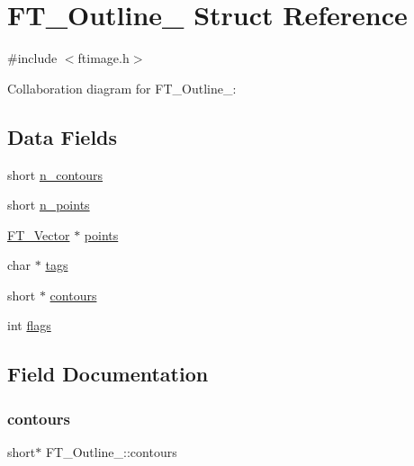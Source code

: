 \hypertarget{struct_f_t___outline__}{}\section{F\+T\+\_\+\+Outline\+\_\+ Struct Reference}
\label{struct_f_t___outline__}


{\ttfamily \#include $<$ftimage.\+h$>$}



Collaboration diagram for F\+T\+\_\+\+Outline\+\_\+\+:
\subsection*{Data Fields}
\begin{DoxyCompactItemize}
\item 
short \hyperlink{struct_f_t___outline___a0313ba9c2c51f10e6b7d7ef97bd946e2}{n\+\_\+contours}
\item 
short \hyperlink{struct_f_t___outline___a7ebcf3c33231af88655534d1ac02b66e}{n\+\_\+points}
\item 
\hyperlink{ftimage_8h_ab158b5a7e422acb1968af95db786d018}{F\+T\+\_\+\+Vector} $\ast$ \hyperlink{struct_f_t___outline___a4871896a2f38bdab947e30a7cf6bca04}{points}
\item 
char $\ast$ \hyperlink{struct_f_t___outline___ac84ca66907361e1f49ec11c14720087a}{tags}
\item 
short $\ast$ \hyperlink{struct_f_t___outline___a218fdea14003061142ac1045ac50affa}{contours}
\item 
int \hyperlink{struct_f_t___outline___a149765f0be0eab4fc82410cf853964bf}{flags}
\end{DoxyCompactItemize}


\subsection{Field Documentation}
\mbox{\label{struct_f_t___outline___a218fdea14003061142ac1045ac50affa}} 
\subsubsection{\texorpdfstring{contours}{contours}}
{\footnotesize\ttfamily short$\ast$ F\+T\+\_\+\+Outline\+\_\+\+::contours}

